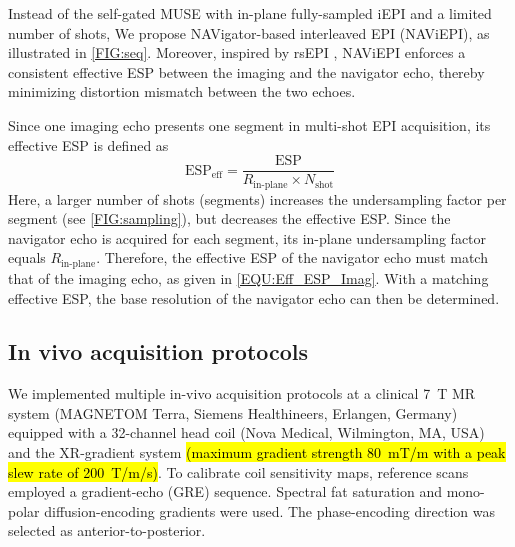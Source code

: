 \documentclass[preprint,12pt,authoryear,review]{elsarticle}
\begin{document}
    Instead of the self-gated MUSE with in-plane fully-sampled iEPI
    and a limited number of shots,
    We propose NAVigator-based interleaved EPI (NAViEPI),
    as illustrated in \cref{FIG:seq}.
    Moreover, inspired by rsEPI \citep{porter_2009_resolve},
    NAViEPI enforces a consistent effective ESP
    between the imaging and the navigator echo,
    thereby minimizing distortion mismatch between the two echoes.

    Since one imaging echo presents
    one segment in multi-shot EPI acquisition,
    its effective ESP is defined as
    \begin{equation}
        \mathrm{ESP}_{\mathrm{eff}} = \frac{\mathrm{ESP}}{R_\text{in-plane} \times N_\mathrm{shot}}
        \label{EQU:Eff_ESP_Imag}
    \end{equation}
    Here, a larger number of shots (segments) increases
    the undersampling factor per segment (see \cref{FIG:sampling}),
    but decreases the effective ESP.
    Since the navigator echo is acquired for each segment,
    its in-plane undersampling factor
    equals $R_\text{in-plane}$.
    Therefore, the effective ESP of the navigator echo
    must match that of the imaging echo,
    as given in \cref{EQU:Eff_ESP_Imag}.
    With a matching effective ESP,
    the base resolution of the navigator echo
    can then be determined.

    \subsection{In vivo acquisition protocols}

    We implemented multiple in-vivo acquisition protocols
    at a clinical \SI{7}{\tesla} MR system
    (MAGNETOM Terra, Siemens Healthineers, Erlangen, Germany)
    equipped with a 32-channel head coil (Nova Medical, Wilmington, MA, USA)
    and the XR-gradient system
    \hl{(maximum gradient strength \mbox{\SI{80}{\milli\tesla / \meter}}
    with a peak slew rate of \mbox{\SI{200}{\tesla / \meter / \second}})}. 
    To calibrate coil sensitivity maps, reference scans employed a gradient-echo (GRE) sequence.
    Spectral fat saturation and mono-polar diffusion-encoding gradients were used.
    The phase-encoding direction was selected as anterior-to-posterior.
\end{document}
